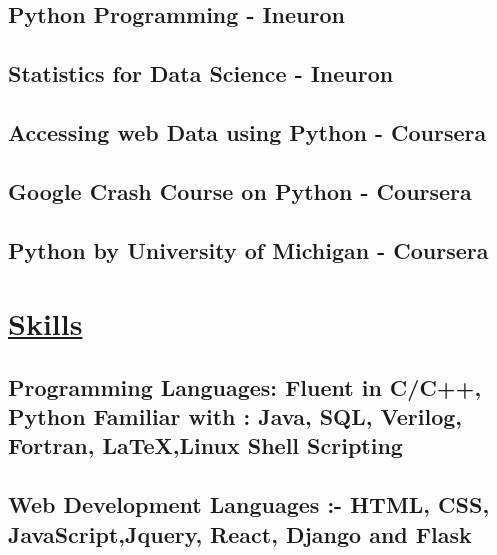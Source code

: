 \documentclass{article}
\begin{document}
\subsection{\textbf{Python Programming}
    \textmd{- Ineuron}}

\subsection{\textbf{Statistics for Data Science}
    \textmd{- Ineuron}}


\subsection{\textbf{Accessing web Data using Python}
    \textmd{- Coursera}}

\subsection{\textbf{Google Crash Course on Python}
    \textmd{- Coursera}}

\subsection{\textbf{Python by University of Michigan}
    \textmd{- Coursera}}


\section{\underline{Skills}}

\subsection{\textbf{Programming Languages:}
    \textmd{Fluent in C/C++, Python }\newline
    \textmd{Familiar with : Java, SQL, Verilog, Fortran, {\LaTeX},Linux Shell Scripting } }


\subsection{\textbf{Web Development Languages :}\textmd{- HTML, CSS, JavaScript,Jquery, React, Django and Flask}}
\end{document}

